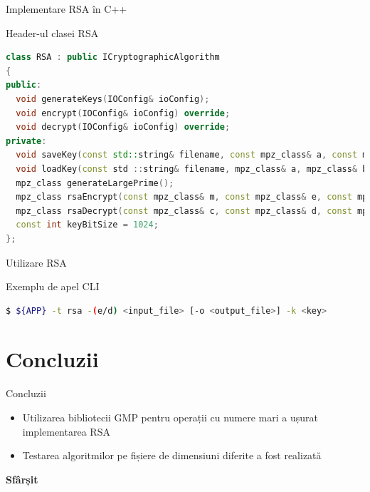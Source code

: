 \documentclass{beamer}
\begin{document}
\begin{frame}[fragile]{Implementare RSA în C++}
  \begin{block}{Header-ul clasei RSA}
    \begin{lstlisting}[language=C++]
class RSA : public ICryptographicAlgorithm
{
public:
  void generateKeys(IOConfig& ioConfig);
  void encrypt(IOConfig& ioConfig) override;
  void decrypt(IOConfig& ioConfig) override;
private:
  void saveKey(const std::string& filename, const mpz_class& a, const mpz_class& b);
  void loadKey(const std ::string& filename, mpz_class& a, mpz_class& b);
  mpz_class generateLargePrime();
  mpz_class rsaEncrypt(const mpz_class& m, const mpz_class& e, const mpz_class& n);
  mpz_class rsaDecrypt(const mpz_class& c, const mpz_class& d, const mpz_class& n);
  const int keyBitSize = 1024;
};
    \end{lstlisting}
  \end{block}
\end{frame}


\begin{frame}[fragile]{Utilizare RSA}
  \begin{block}{Exemplu de apel CLI}
    \begin{lstlisting}[language=bash]
$ ${APP} -t rsa -(e/d) <input_file> [-o <output_file>] -k <key>
    \end{lstlisting}
  \end{block}
\end{frame}

\section{Concluzii}

\begin{frame}{Concluzii}
  \begin{itemize}
    \item Utilizarea bibliotecii GMP pentru operații cu numere mari a ușurat implementarea RSA
    \item Testarea algoritmilor pe fișiere de dimensiuni diferite a fost realizată
  \end{itemize}
\end{frame}

\begin{frame}[plain]
  \centering
  \Huge\bfseries
  \textcolor{myblue}{Sfârșit}
\end{frame}
\end{document}
